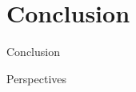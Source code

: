 \section{Conclusion}
  \begin{frame}{Conclusion}
  \end{frame}

  \begin{frame}{Perspectives}
  \end{frame}


